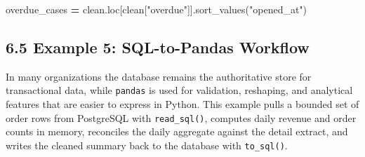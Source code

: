 \documentclass[
  12pt,
]{article}
\newenvironment{Shaded}{\begin{snugshade}}{\end{snugshade}}
\newcommand{\NormalTok}[1]{#1}
\newcommand{\OperatorTok}[1]{\textcolor[rgb]{0.81,0.36,0.00}{\textbf{#1}}}
\newcommand{\StringTok}[1]{\textcolor[rgb]{0.31,0.60,0.02}{#1}}
\begin{document}
\begin{Shaded}
\begin{Highlighting}[]
\NormalTok{overdue\_cases }\OperatorTok{=}\NormalTok{ clean.loc[clean[}\StringTok{"overdue"}\NormalTok{]].sort\_values(}\StringTok{"opened\_at"}\NormalTok{)}
\end{Highlighting}
\end{Shaded}

\subsection{6.5 Example 5: SQL-to-Pandas
Workflow}\label{example-5-sql-to-pandas-workflow}

In many organizations the database remains the authoritative store for
transactional data, while \texttt{pandas} is used for validation,
reshaping, and analytical features that are easier to express in Python.
This example pulls a bounded set of order rows from PostgreSQL with
\texttt{read\_sql()}, computes daily revenue and order counts in memory,
reconciles the daily aggregate against the detail extract, and writes
the cleaned summary back to the database with \texttt{to\_sql()}.
\end{document}
